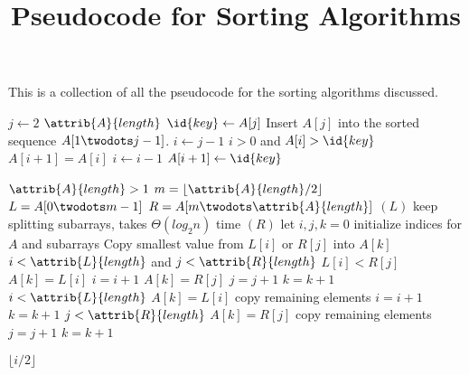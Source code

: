 \documentclass[12pt]{article}
\title{Pseudocode for Sorting Algorithms}
\author{}
\date{}
\begin{document}
\maketitle

This is a collection of all the pseudocode for the sorting algorithms discussed.

\begin{codebox}
\li \For $j \gets 2$ \To $\attrib{A}{length}$
\li     \Do
            $\id{key} \gets A[j]$
\li         \Comment Insert $A[j]$ into the sorted sequence $A[1 \twodots j-1]$.
\li         $i \gets j-1$
\li         \While $i > 0$ and $A[i] > \id{key}$
\li             \Do
                    $A[i + 1] = A[i]$
\li                 $i \gets i-1$
                \End
\li         $A[i+1] \gets \id{key}$
        \End
\end{codebox}

\begin{codebox}
\li \If $\attrib{A}{length} > 1$
\li \Then
        $m = \lfloor \attrib{A}{length}/2 \rfloor$
\li     $L = A[0 \twodots m-1]$
\li     $R = A[m \twodots \attrib{A}{length}]$
\li     {}$(L)$ \Comment keep splitting subarrays, takes $\Theta{(log_2{n})}$ time
\li     {}$(R)$
\li     let $i, j, k = 0$ \Comment initialize indices for $A$ and subarrays
\li     \Comment Copy smallest value from $L[i]$ or $R[j]$ into $A[k]$
\li     \While $i < \attrib{L}{length}$ and $j < \attrib{R}{length}$
\li     \Do
            \If $L[i] < R[j]$
\li         \Then
                $A[k] = L[i]$
\li             $i = i + 1$
\li         \Else
\li             $A[k] = R[j]$
\li             $j = j + 1$
            \End
\li     $k = k + 1$
        \End
\li     \While $i < \attrib{L}{length}$
\li     \Do
            $A[k] = L[i]$ \Comment copy remaining elements
\li         $i = i + 1$
\li         $k = k + 1$
        \End
\li     \While $j < \attrib{R}{length}$
\li     \Do
            $A[k] = R[j]$ \Comment copy remaining elements
\li         $j = j + 1$
\li         $k = k + 1$
        \End
    \End
\end{codebox}

\newpage

\begin{codebox}
\li \Return $\lfloor i/2 \rfloor$
\end{codebox}
\end{document}
